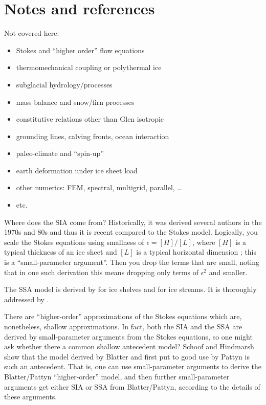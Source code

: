 \documentclass[titlepage,letterpaper,final,12pt]{scrartcl}
\newcommand{\eps}{\epsilon}
\begin{document}
\section{Notes and references}

Not covered here:
  \begin{itemize}
  \item Stokes and ``higher order'' flow equations
  \item thermomechanical coupling or polythermal ice
  \item subglacial hydrology/processes
  \item mass balance and snow/firn processes
  \item constitutive relations other than Glen isotropic
  \item grounding lines, calving fronts, ocean interaction
  \item paleo-climate and ``spin-up''
  \item earth deformation under ice sheet load
  \item other numerics: FEM, spectral, multigrid, parallel, \dots
  \item etc.
  \end{itemize}

Where does the SIA come from?    Historically, it was derived several authors in the 1970s and 80s \cite{FowlerLarson1978,MorlandJohnson,Hutter} and thus it is recent compared to the Stokes model.  Logically, you scale the Stokes equations using smallness of $\eps = [H]/[L]$, where $[H]$ is a typical thickness of an ice sheet and $[L]$ is a typical horizontal dimension \cite{Fowler}; this is a ``small-parameter argument''.  Then you drop the terms that are small, noting that in one such derivation this means dropping only terms of $\eps^2$ and smaller.

The SSA model is derived by \cite{Morland} for ice shelves and \cite{MacAyeal} for ice streams.  It is thoroughly addressed by \cite{WeisGreveHutter}.

There are ``higher-order'' approximations of the Stokes equations which are, nonetheless, shallow approximations.  In fact, both the SIA and the SSA are derived by small-parameter arguments from the Stokes equations, so one might ask whether there a common shallow antecedent model?  Schoof and Hindmarsh \cite{SchoofHindmarsh} show that the model derived by Blatter\nocite{Blatter} and first put to good use by Pattyn \cite{Pattyn03} is such an antecedent.  That is, one can use small-parameter arguments to derive the Blatter/Pattyn ``higher-order'' model, and then further small-parameter arguments get either SIA or SSA from Blatter/Pattyn, according to the details of these arguments.
\end{document}
